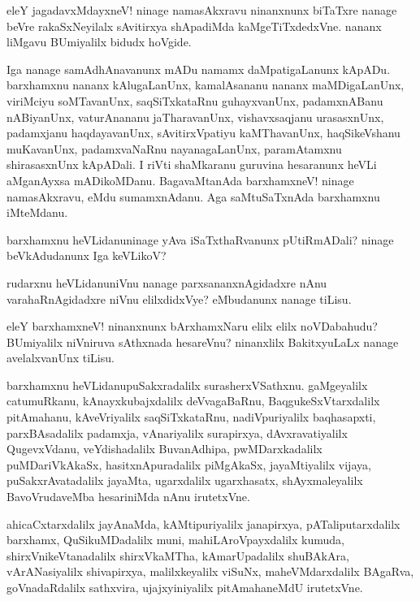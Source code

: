 \begin{mng}
eleY jagadavxMdayxneV! ninage namasAkxravu ninanxnunx biTaTxre nanage beVre rakaSxNeyilalx sAvitirxya shApadiMda kaMgeTiTxdedxVne. nananx liMgavu BUmiyalilx bidudx hoVgide.
\end{mng}

\begin{mng}
Iga nanage samAdhAnavanunx mADu namamx daMpatigaLanunx kApADu. barxhamxnu nananx kAlugaLanUnx, kamalAsananu nananx maMDigaLanUnx, viriMciyu soMTavanUnx, saqSiTxkataRnu guhayxvanUnx, padamxnABanu nABiyanUnx, vaturAnananu jaTharavanUnx, vishavxsaqjanu urasasxnUnx, padamxjanu haqdayavanUnx, sAvitirxVpatiyu kaMThavanUnx, haqSikeVshanu muKavanUnx, padamxvaNaRnu nayanagaLanUnx, paramAtamxnu shirasasxnUnx kApADali. I riVti shaMkaranu guruvina hesaranunx heVLi aMganAyxsa mADikoMDanu. BagavaMtanAda barxhamxneV! ninage namasAkxravu, eMdu sumamxnAdanu. Aga saMtuSaTxnAda barxhamxnu iMteMdanu.
\end{mng}

\begin{mng}
barxhamxnu heVLidanu\mdash ninage yAva iSaTxthaRvanunx pUtiRmADali? ninage beVkAdudanunx Iga keVLikoV?
\end{mng}

\begin{mng}
rudarxnu heVLidanu\mdash niVnu nanage parxsananxnAgidadxre nAnu varahaRnAgidadxre niVnu elilxdidxVye? eMbudanunx nanage tiLisu.
\end{mng}

\begin{mng}
eleY barxhamxneV! ninanxnunx bArxhamxNaru elilx elilx noVDabahudu? BUmiyalilx niVniruva sAthxnada hesareVnu? ninanxlilx BakitxyuLaLx nanage avelalxvanUnx tiLisu.
\end{mng}

\begin{mng}
barxhamxnu heVLidanu\mdash puSakxradalilx surasherxVSathxnu. gaMgeyalilx catumuRkanu, kAnayxkubajxdalilx deVvagaBaRnu, BaqgukeSxVtarxdalilx pitAmahanu, kAveVriyalilx saqSiTxkataRnu, nadiVpuriyalilx baqhasapxti, parxBAsadalilx padamxja, vAnariyalilx surapirxya, dAvxravatiyalilx QugevxVdanu, veYdishadalilx BuvanAdhipa, pwMDarxkadalilx puMDariVkAkaSx, hasitxnApuradalilx piMgAkaSx, jayaMtiyalilx vijaya, puSakxrAvatadalilx jayaMta, ugarxdalilx ugarxhasatx, shAyxmaleyalilx BavoVrudaveMba hesariniMda nAnu irutetxVne.
\end{mng}

\begin{mng}
ahicaCxtarxdalilx jayAnaMda, kAMtipuriyalilx janapirxya, pATaliputarxdalilx barxhamx, QuSikuMDadalilx muni, mahiLAroVpayxdalilx kumuda, shirxVnikeVtanadalilx shirxVkaMTha, kAmarUpadalilx shuBAkAra, vArANasiyalilx shivapirxya, malilxkeyalilx viSuNx, maheVMdarxdalilx BAgaRva, goVnadaRdalilx sathxvira, ujajxyiniyalilx pitAmahaneMdU irutetxVne.
\end{mng}

